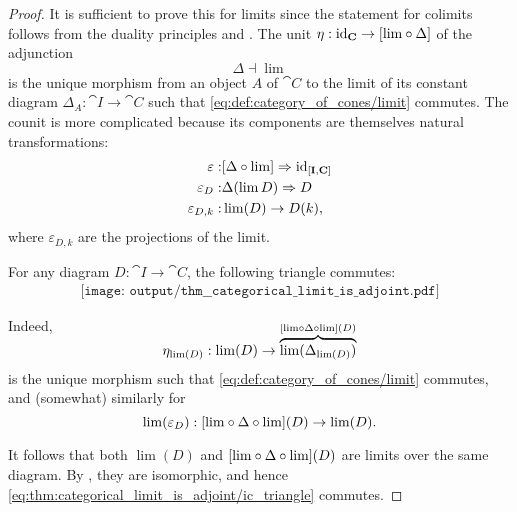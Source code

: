 \begin{proof}
  It is sufficient to prove this for limits since the statement for colimits follows from the duality principles  and . The unit \( \eta: \id_{\cat{C}} \to [{\lim} \bincirc \Delta] \) of the adjunction
  \begin{equation*}
    \Delta \dashv \lim
  \end{equation*}
  is the unique morphism from an object \( A \) of \( \cat{C} \) to the limit of its constant diagram \( \Delta_A: \cat{I} \to \cat{C} \) such that \eqref{eq:def:category_of_cones/limit} commutes. The counit is more complicated because its components are themselves natural transformations:
  \begin{equation*}
    \begin{aligned}
      \varepsilon:       &[\Delta \bincirc \lim] \Rightarrow \id_{[\cat{I}, \cat{C}]} \\
      \varepsilon_D:     &\Delta(\lim D) \Rightarrow D \\
      \varepsilon_{D,k}: &\lim(D) \to D(k),
    \end{aligned}
  \end{equation*}
  where \( \varepsilon_{D,k} \) are the projections of the limit.

  For any diagram \( D: \cat{I} \to \cat{C} \), the following triangle commutes:
  \begin{equation}\label{eq:thm:categorical_limit_is_adjoint/ic_triangle}
    \begin{aligned}
      \texttt{[image: output/thm\_\_categorical\_limit\_is\_adjoint.pdf]}
    \end{aligned}
  \end{equation}

  Indeed,
  \begin{equation*}
    \eta_{\lim(D)}: \lim(D) \to \smash{ \overbrace{\lim(\Delta_{\lim(D)})}^{[{\lim} \bincirc \Delta \bincirc {\lim}](D)} }
  \end{equation*}
  is the unique morphism such that \eqref{eq:def:category_of_cones/limit} commutes, and (somewhat) similarly for
  \begin{equation*}
    \lim(\varepsilon_D): [{\lim} \bincirc \Delta \bincirc {\lim}](D) \to \lim(D).
  \end{equation*}

  It follows that both \( \lim(D) \) and \( [{\lim} \bincirc \Delta \bincirc {\lim}](D) \) are limits over the same diagram. By , they are isomorphic, and hence \eqref{eq:thm:categorical_limit_is_adjoint/ic_triangle} commutes.


\end{proof}
